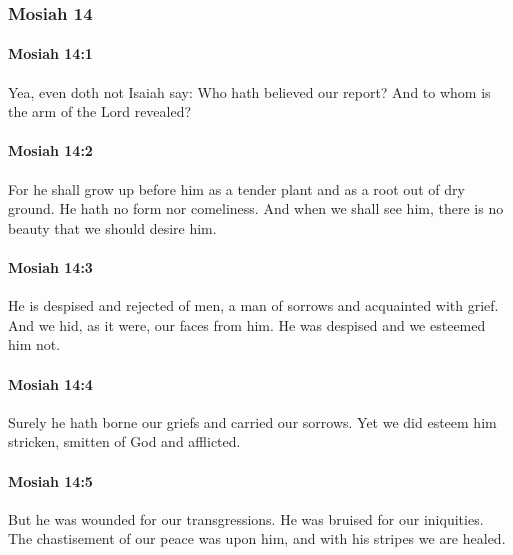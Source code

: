 	\subsubsection{Mosiah 14} %
		\label{MOSIAH-14}
		
		\paragraph{Mosiah 14:1} %
			\label{MOSIAH-14-1}

			Yea, even doth not Isaiah say:
			Who hath believed our report?
			And to whom is the arm of the Lord revealed?

		\paragraph{Mosiah 14:2} %
			\label{MOSIAH-14-2}

			For he shall grow up before him
			as a tender plant and as a root out of dry ground.
			He hath no form nor comeliness.
			And when we shall see him,
			there is no beauty that we should desire him.

		\paragraph{Mosiah 14:3} %
			\label{MOSIAH-14-3}

			He is despised and rejected of men,
			a man of sorrows and acquainted with grief.
			And we hid, as it were, our faces from him.
			He was despised and we esteemed him not.

		\paragraph{Mosiah 14:4} %
			\label{MOSIAH-14-4}

			Surely he hath borne our griefs and carried our sorrows.
			Yet we did esteem him stricken,
			smitten of God and afflicted.

		\paragraph{Mosiah 14:5} %
			\label{MOSIAH-14-5}

			But he was wounded for our transgressions.
			He was bruised for our iniquities.
			The chastisement of our peace was upon him,
			and with his stripes we are healed.

